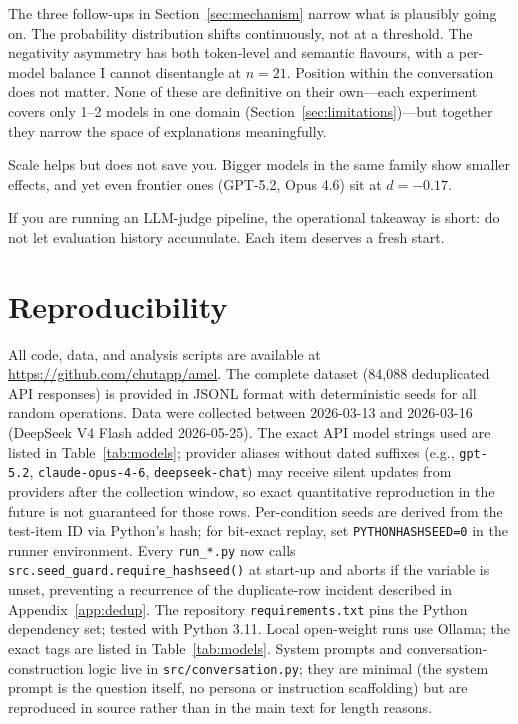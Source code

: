 \documentclass[10pt,twocolumn]{article}
\newcommand{\xspace}{}
\newcommand{\eg}{e.g.,\xspace}
\begin{document}
The three follow-ups in Section~\ref{sec:mechanism} narrow what is plausibly going on. The probability distribution shifts continuously, not at a threshold. The negativity asymmetry has both token-level and semantic flavours, with a per-model balance I cannot disentangle at $n = 21$. Position within the conversation does not matter. None of these are definitive on their own---each experiment covers only 1--2 models in one domain (Section~\ref{sec:limitations})---but together they narrow the space of explanations meaningfully.

Scale helps but does not save you. Bigger models in the same family show smaller effects, and yet even frontier ones (GPT-5.2, Opus 4.6) sit at $d = -0.17$.

If you are running an LLM-judge pipeline, the operational takeaway is short: do not let evaluation history accumulate. Each item deserves a fresh start.


\section*{Reproducibility}
All code, data, and analysis scripts are available at \url{https://github.com/chutapp/amel}.
The complete dataset (84,088 deduplicated API responses) is provided in JSONL format with deterministic seeds for all random operations.
Data were collected between 2026-03-13 and 2026-03-16 (DeepSeek V4 Flash added 2026-05-25).
The exact API model strings used are listed in Table~\ref{tab:models}; provider aliases without dated suffixes (\eg{} \texttt{gpt-5.2}, \texttt{claude-opus-4-6}, \texttt{deepseek-chat}) may receive silent updates from providers after the collection window, so exact quantitative reproduction in the future is not guaranteed for those rows.
Per-condition seeds are derived from the test-item ID via Python's hash; for bit-exact replay, set \texttt{PYTHONHASHSEED=0} in the runner environment. Every \texttt{run\_*.py} now calls \texttt{src.seed\_guard.require\_hashseed()} at start-up and aborts if the variable is unset, preventing a recurrence of the duplicate-row incident described in Appendix~\ref{app:dedup}.
The repository \texttt{requirements.txt} pins the Python dependency set; tested with Python 3.11.
Local open-weight runs use Ollama; the exact tags are listed in Table~\ref{tab:models}.
System prompts and conversation-construction logic live in \texttt{src/conversation.py}; they are minimal (the system prompt is the question itself, no persona or instruction scaffolding) but are reproduced in source rather than in the main text for length reasons.
\end{document}
